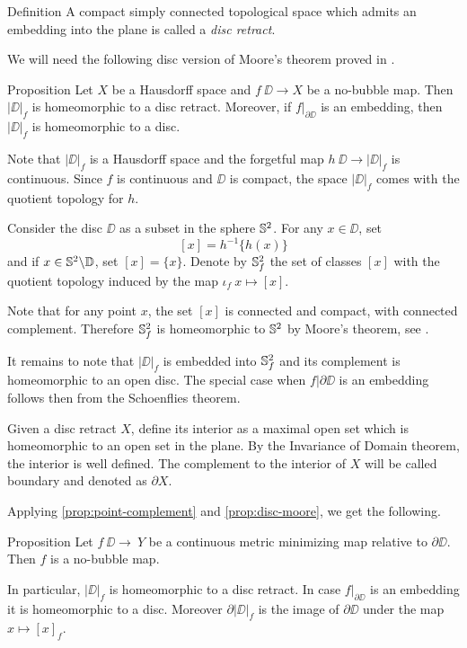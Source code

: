 \documentclass[a4paper,10pt]{amsart}
\begin{document}
\begin{thm}{Definition}
A compact simply connected topological space which admits an embedding into the plane is 
called a \emph{disc retract}. 
\end{thm}




We will need the following disc version of Moore's theorem proved in \cite{moore}.

\begin{thm}{Proposition}\label{prop:disc-moore}
Let $X$ be a Hausdorff space and
$f\:\DD\to X$ be a no-bubble map.
Then $|\DD|_f$ is homeomorphic to a disc retract. Moreover, if $f|_{\partial\DD}$ is 
an embedding, then $|\DD|_f$ is homeomorphic to a disc.
\end{thm}


Note that $|\DD|_f$ is a Hausdorff space
and the forgetful map $h\:\DD\to |\DD|_f$ is continuous.
Since $f$ is continuous and $\DD$ is compact, the space $|\DD|_f$ comes with the quotient topology for $h$. 

Consider the disc $\DD$ as a subset in the sphere $\mathbb{S}^2$.
For any $x\in \DD$, set 
\[[x]=h^{-1}\{h(x)\}\]
and
if $x\in \mathbb{S}^2\backslash \mathbb{D}$, set $[x]=\{x\}$.
Denote by $\mathbb{S}^2_f$ the set of classes $[x]$ with the quotient topology induced by the map $\iota_f\:x\mapsto [x]$.

Note that for any point $x$, the set $[x]$ is connected and compact, with connected complement.
Therefore $\mathbb{S}^2_f$ is homeomorphic to $\mathbb{S}^2$ by Moore's theorem, see \cite{moore}.

It remains to note that $|\DD|_f$ is embedded into $\mathbb{S}^2_f$ and its complement is homeomorphic to an open disc.
The special case when $f|{\partial\DD}$ is an embedding follows then from the Schoenflies theorem.
\qeds

Given a disc retract $X$,
define its interior as a maximal open set which is homeomorphic to an open set in the plane.
By the Invariance of Domain theorem, the interior is well defined.
The complement to the interior of $X$ will be called boundary and denoted as $\partial X$.

Applying \ref{prop:point-complement} and \ref{prop:disc-moore}, we get the following.

\begin{thm}{Proposition}\label{prop:|D|}
Let $f\:\DD\to\ Y$ be a continuous metric minimizing map relative to $\partial \DD$.
Then $f$ is a no-bubble map.

In particular,  $|\DD|_f$ is homeomorphic to a disc retract. In case $f|_{\partial\DD}$ is an
embedding it is homeomorphic to a disc.
Moreover $\partial|\DD|_f$ is the image of $\partial \DD$
under the map $x\mapsto [x]_f$.
\end{thm}
\end{document}

